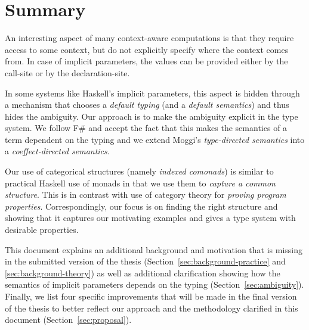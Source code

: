 \documentclass[
		twoside,openright,titlepage,numbers=noenddot,headinclude,%
                footinclude=true,cleardoublepage=empty,
                BCOR=10mm,paper=a4,fontsize=10pt, %
                ngerman,american, %
                ]{scrreprt}
\begin{document}

\section{Summary}

An interesting aspect of many context-aware computations is that they require access to some
context, but do not explicitly specify where the context comes from. In case of implicit parameters,
the values can be provided either by the call-site or by the declaration-site.

In some systems like Haskell's implicit parameters, this aspect is hidden through a mechanism that
chooses a \emph{default typing} (and a \emph{default semantics}) and thus hides the ambiguity. Our approach is
to make the ambiguity explicit in the type system. We follow F\# and accept the fact that this
makes the semantics of a term dependent on the typing and we extend Moggi's \emph{type-directed
semantics} into a \emph{coeffect-directed semantics}.

Our use of categorical structures (namely \emph{indexed comonads}) is similar to practical Haskell
use of monads in that we use them to \emph{capture a common structure}. This is in contrast with
use of category theory for \emph{proving program properties}. Correspondingly, our focus is on
finding the right structure and showing that it captures our motivating examples and gives a type
system with desirable properties.

This document explains an additional background and motivation that is missing in the submitted
version of the thesis (Section~\ref{sec:background-practice} and \ref{sec:background-theory}) as
well as additional clarification showing how the semantics of implicit parameters depends on the
typing (Section~\ref{sec:ambiguity}). Finally, we list four specific improvements that will be
made in the final version of the thesis to better reflect our approach and the methodology
clarified in this document (Section~\ref{sec:proposal}).



\end{document}
